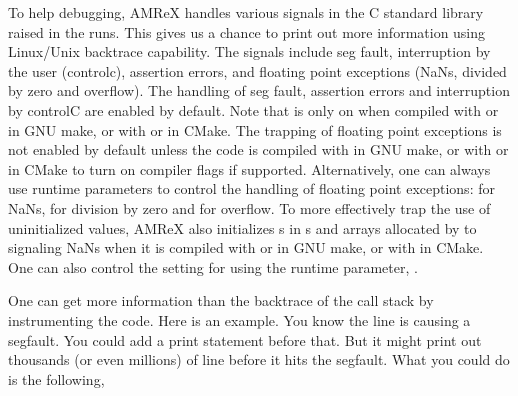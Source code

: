 \documentclass[letterpaper,10pt,english]{sphinxmanual}
\begin{document}
\sphinxAtStartPar
To help debugging, AMReX handles various signals in the C standard
library raised in the runs.  This gives us a chance to print out more
information using Linux/Unix backtrace capability.  The signals
include seg fault, interruption by the user (control\sphinxhyphen{}c), assertion
errors, and floating point exceptions (NaNs, divided by zero and
overflow).  The handling of seg fault, assertion errors and
interruption by control\sphinxhyphen{}C are enabled by default.  Note that
 is only on when compiled with  or
 in GNU make, or with  or
 in CMake.  The trapping of floating point exceptions is not
enabled by default unless the code is compiled with  in GNU make, or with
 or  in CMake to turn on compiler flags
if supported.  Alternatively, one can always use runtime parameters to control the
handling of floating point exceptions:  for
NaNs,  for division by zero and
 for overflow.  To more effectively trap the
use of uninitialized values, AMReX also initializes s in
s and arrays allocated by  to signaling NaNs when it is compiled
with  or  in GNU make, or with  in CMake.
One can also control the setting for  using the runtime parameter, .

\sphinxAtStartPar
One can get more information than the backtrace of the call stack by
instrumenting the code.  Here is an example.
You know the line  is causing a segfault.  You
could add a print statement before that.  But it might print out
thousands (or even millions) of line before it hits the segfault.  What
you could do is the following,
\end{document}
